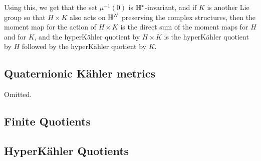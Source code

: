 \documentclass{article}
\begin{document}
Using this, we get that the set \(\mu^{-1}(0)\) is \(\mathbb{H}^*\)-invariant, and if \(K\) is another Lie group so that \(H \times K\) also acts on \(\mathbb{H}^N\) preserving the complex structures, then the moment map for the action of \(H \times K\) is the direct sum of the moment maps for \(H\) and for \(K\), and the hyperK\"ahler quotient by \(H \times K\) is the hyperK\"ahler quotient by \(H\) followed by the hyperK\"ahler quotient by \(K\).

\subsection{Quaternionic K\"ahler metrics}

Omitted.

\subsection{Finite Quotients}

\subsection{HyperK\"ahler Quotients}

\printbibliography
\end{document}
